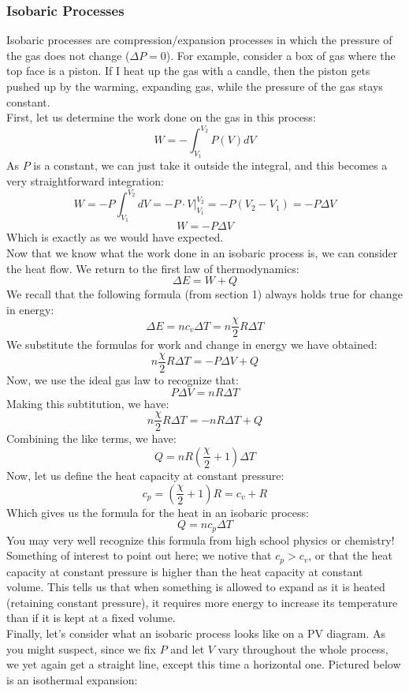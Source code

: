 \subsubsection{Isobaric Processes}
Isobaric processes are compression/expansion processes in which the pressure of the gas does not change ($\Delta P = 0$). For example, consider a box of gas where the top face is a piston. If I heat up the gas with a candle, then the piston gets pushed up by the warming, expanding gas, while the pressure of the gas stays constant.  \\

First, let us determine the work done on the gas in this process:
\[W = -\int_{V_1}^{V_2} P(V)dV \]
As $P$ is a constant, we can just take it outside the integral, and this becomes a very straightforward integration:
\[W = -P\int_{V_1}^{V_2} dV = -P \cdot \left. V \right|_{V_1}^{V_2} = -P(V_2-V_1) = -P\Delta V\]
\begin{equation}
    W = -P\Delta V
\end{equation}
Which is exactly as we would have expected. \\

Now that we know what the work done in an isobaric process is, we can consider the heat flow. We return to the first law of thermodynamics:
\[ \Delta E = W + Q \]
We recall that the following formula (from section 1) always holds true for change in energy:
\[ \Delta E = nc_v\Delta T = n \frac{\chi}{2}R\Delta T \]
We substitute the formulas for work and change in energy we have obtained:
\[ n \frac{\chi}{2}R\Delta T  = -P\Delta V + Q \]
Now, we use the ideal gas law to recognize that:
\[ P\Delta V = nR \Delta T \]
Making this subtitution, we have:
\[ n \frac{\chi}{2}R\Delta T = -nR \Delta T + Q \]
Combining the like terms, we have:
\[ Q = nR\left(\frac{\chi}{2}+1\right)\Delta T \]
Now, let us define the heat capacity at constant pressure:
\begin{equation}
c_p = \left( \frac{\chi}{2}+1 \right)R = c_v+R
\end{equation}
Which gives us the formula for the heat in an isobaric process:
\begin{equation}
    Q = nc_p \Delta T
\end{equation}
You may very well recognize this formula from high school physics or chemistry! Something of interest to point out here; we notive that $c_p>c_v$, or that the heat capacity at constant pressure is higher than the heat capacity at constant volume. This tells us that when something is allowed to expand as it is heated (retaining constant pressure), it requires more energy to increase its temperature than if it is kept at a fixed volume.
\\
Finally, let's consider what an isobaric process looks like on a PV diagram. As you might suspect, since we fix $P$ and let $V$ vary throughout the whole process, we yet again get a straight line, except this time a horizontal one. Pictured below is an isothermal expansion:

